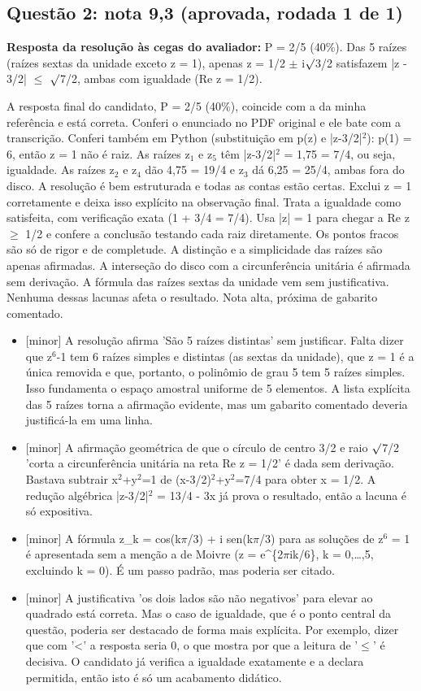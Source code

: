 \documentclass{article}%
\begin{document}
\subsection*{Questão 2: nota 9,3 (aprovada, rodada 1 de 1)}%
\textbf{Resposta da resolução às cegas do avaliador:} P = 2/5 (40\%). Das 5 raízes (raízes sextas da unidade exceto z = 1), apenas z = 1/2 $\pm$ i$\surd$3/2 satisfazem |z - 3/2| $\leq$ $\surd$7/2, ambas com igualdade (Re z = 1/2).\par %
A resposta final do candidato, P = 2/5 (40\%), coincide com a da minha referência e está correta. Conferi o enunciado no PDF original e ele bate com a transcrição. Conferi também em Python (substituição em p(z) e |z-3/2|$^2$): p(1) = 6, então z = 1 não é raiz. As raízes z$_{1}$ e z$_{5}$ têm |z-3/2|$^2$ = 1,75 = 7/4, ou seja, igualdade. As raízes z$_{2}$ e z$_{4}$ dão 4,75 = 19/4 e z$_{3}$ dá 6,25 = 25/4, ambas fora do disco. A resolução é bem estruturada e todas as contas estão certas. Exclui z = 1 corretamente e deixa isso explícito na observação final. Trata a igualdade como satisfeita, com verificação exata (1 + 3/4 = 7/4). Usa |z| = 1 para chegar a Re z $\geq$ 1/2 e confere a conclusão testando cada raiz diretamente. Os pontos fracos são só de rigor e de completude. A distinção e a simplicidade das raízes são apenas afirmadas. A interseção do disco com a circunferência unitária é afirmada sem derivação. A fórmula das raízes sextas da unidade vem sem justificativa. Nenhuma dessas lacunas afeta o resultado. Nota alta, próxima de gabarito comentado.%
\begin{itemize}%
\item%
{[}minor{]} A resolução afirma 'São 5 raízes distintas' sem justificar. Falta dizer que z$^{6}$-1 tem 6 raízes simples e distintas (as sextas da unidade), que z = 1 é a única removida e que, portanto, o polinômio de grau 5 tem 5 raízes simples. Isso fundamenta o espaço amostral uniforme de 5 elementos. A lista explícita das 5 raízes torna a afirmação evidente, mas um gabarito comentado deveria justificá{-}la em uma linha.%
\item%
{[}minor{]} A afirmação geométrica de que o círculo de centro 3/2 e raio $\surd$7/2 'corta a circunferência unitária na reta Re z = 1/2' é dada sem derivação. Bastava subtrair x$^2$+y$^2$=1 de (x-3/2)$^2$+y$^2$=7/4 para obter x = 1/2. A redução algébrica |z-3/2|$^2$ = 13/4 - 3x já prova o resultado, então a lacuna é só expositiva.%
\item%
{[}minor{]} A fórmula z\_k = cos(k$\pi$/3) + i sen(k$\pi$/3) para as soluções de z$^{6}$ = 1 é apresentada sem a menção a de Moivre (z = e\^{}\{2$\pi$ik/6\}, k = 0,\ldots{},5, excluindo k = 0). É um passo padrão, mas poderia ser citado.%
\item%
{[}minor{]} A justificativa 'os dois lados são não negativos' para elevar ao quadrado está correta. Mas o caso de igualdade, que é o ponto central da questão, poderia ser destacado de forma mais explícita. Por exemplo, dizer que com '<' a resposta seria 0, o que mostra por que a leitura de '$\leq$' é decisiva. O candidato já verifica a igualdade exatamente e a declara permitida, então isto é só um acabamento didático.%
\end{itemize}%
\end{document}
